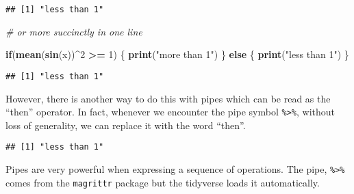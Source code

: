 \documentclass[12pt,]{article}
\newenvironment{Shaded}{\begin{snugshade}}{\end{snugshade}}
\newcommand{\KeywordTok}[1]{\textcolor[rgb]{0.13,0.29,0.53}{\textbf{#1}}}
\newcommand{\DecValTok}[1]{\textcolor[rgb]{0.00,0.00,0.81}{#1}}
\newcommand{\StringTok}[1]{\textcolor[rgb]{0.31,0.60,0.02}{#1}}
\newcommand{\CommentTok}[1]{\textcolor[rgb]{0.56,0.35,0.01}{\textit{#1}}}
\newcommand{\ControlFlowTok}[1]{\textcolor[rgb]{0.13,0.29,0.53}{\textbf{#1}}}
\newcommand{\OperatorTok}[1]{\textcolor[rgb]{0.81,0.36,0.00}{\textbf{#1}}}
\newcommand{\NormalTok}[1]{#1}
\begin{document}
\begin{verbatim}
## [1] "less than 1"
\end{verbatim}

\begin{Shaded}
\begin{Highlighting}[]
\CommentTok{# or more succinctly in one line}

\ControlFlowTok{if}\NormalTok{(}\KeywordTok{mean}\NormalTok{(}\KeywordTok{sin}\NormalTok{(x))}\OperatorTok{^}\DecValTok{2} \OperatorTok{>=}\StringTok{ }\DecValTok{1}\NormalTok{)}
\NormalTok{\{}
  \KeywordTok{print}\NormalTok{(}\StringTok{"more than 1"}\NormalTok{)}
\NormalTok{\} }\ControlFlowTok{else}
\NormalTok{\{}
  \KeywordTok{print}\NormalTok{(}\StringTok{"less than 1"}\NormalTok{)}
\NormalTok{\}}
\end{Highlighting}
\end{Shaded}

\begin{verbatim}
## [1] "less than 1"
\end{verbatim}

However, there is another way to do this with pipes which can be read as
the ``then'' operator. In fact, whenever we encounter the pipe symbol
\texttt{\%\textgreater{}\%}, without loss of generality, we can replace
it with the word ``then''.

\begin{Shaded}
\end{Shaded}

\begin{verbatim}
## [1] "less than 1"
\end{verbatim}

Pipes are very powerful when expressing a sequence of operations. The
pipe, \texttt{\%\textgreater{}\%} comes from the \texttt{magrittr}
package but the tidyverse loads it automatically.
\end{document}
